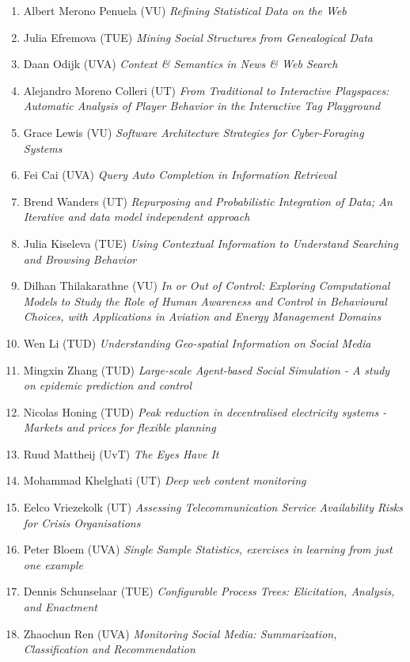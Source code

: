 \begin{multicols}{2}
\begin{scriptsize}
\begin{enumerate}[leftmargin=*,noitemsep,topsep=0pt,parsep=1pt,partopsep=0pt]
{}\item Albert Merono Penuela (VU) \textit{Refining Statistical Data on the Web
}\item Julia Efremova (TUE) \textit{Mining Social Structures from Genealogical Data
}\item Daan Odijk (UVA) \textit{Context \& Semantics in News \& Web Search
}\item Alejandro Moreno Colleri (UT) \textit{From Traditional to Interactive Playspaces: Automatic Analysis of Player Behavior in the Interactive Tag Playground
}\item Grace Lewis (VU) \textit{Software Architecture Strategies for Cyber-Foraging Systems
}\item Fei Cai (UVA) \textit{Query Auto Completion in Information Retrieval
}\item Brend Wanders (UT) \textit{Repurposing and Probabilistic Integration of Data; An Iterative and data model independent approach
}\item Julia Kiseleva (TUE) \textit{Using Contextual Information to Understand Searching and Browsing Behavior
}\item Dilhan Thilakarathne (VU) \textit{In or Out of Control: Exploring Computational Models to Study the Role of Human Awareness and Control in Behavioural Choices, with Applications in Aviation and Energy Management Domains
}\item Wen Li (TUD) \textit{Understanding Geo-spatial Information on Social Media
}\item Mingxin Zhang (TUD) \textit{Large-scale Agent-based Social Simulation - A study on epidemic prediction and control
}\item Nicolas Honing (TUD) \textit{Peak reduction in decentralised electricity systems -Markets and prices for flexible planning
}\item Ruud Mattheij (UvT) \textit{The Eyes Have It
}\item Mohammad Khelghati (UT) \textit{Deep web content monitoring
}\item Eelco Vriezekolk (UT) \textit{Assessing Telecommunication Service Availability Risks for Crisis Organisations
}\item Peter Bloem (UVA) \textit{Single Sample Statistics, exercises in learning from just one example
}\item Dennis Schunselaar (TUE) \textit{Configurable Process Trees: Elicitation, Analysis, and Enactment
}\item Zhaochun Ren (UVA) \textit{Monitoring Social Media: Summarization, Classification and Recommendation
}
\end{enumerate}
\end{scriptsize}
\end{multicols}
